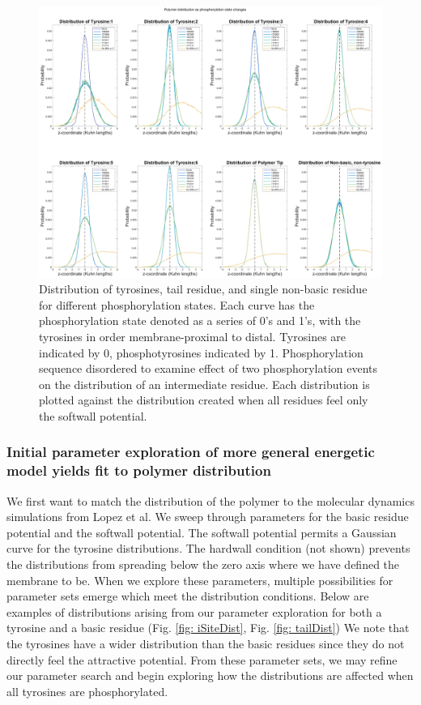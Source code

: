 \documentclass[../../AdvancementSummary.tex]{subfiles}
\begin{document}
\begin{figure}[H]
\begin{center}
\includegraphics[width=\linewidth]{ResultsFigures/CD3ZetaSoftwallPiecewiseBasicsY/Phosphorylation/iSiteDistribution135624.eps}
\end{center}
\caption{Distribution of tyrosines, tail residue, and single non-basic residue for different phosphorylation states. Each curve has the phosphorylation state denoted as a series of 0's and 1's, with the tyrosines in order membrane-proximal to distal. Tyrosines are indicated by 0, phosphotyrosines indicated by 1. Phosphorylation sequence disordered to examine effect of two phosphorylation events on the distribution of an intermediate residue. Each distribution is plotted against the distribution created when all residues feel only the softwall potential. \label{fig: Dist135624}}
\end{figure}

\subsubsection{Initial parameter exploration of more general energetic model yields fit to polymer distribution}

We first want to match the distribution of the polymer to the molecular dynamics simulations from Lopez et al. We sweep through parameters for the basic residue potential and the softwall potential. The softwall potential permits a Gaussian curve for the tyrosine distributions. The hardwall condition (not shown) prevents the distributions from spreading below the zero axis where we have defined the membrane to be. When we explore these parameters, multiple possibilities for parameter sets emerge which meet the distribution conditions. Below are examples of distributions arising from our parameter exploration for both a tyrosine and a basic residue (Fig. \ref{fig: iSiteDist}, Fig. \ref{fig: tailDist}) We note that the tyrosines have a wider distribution than the basic residues since they do not directly feel the attractive potential. From these parameter sets, we may refine our parameter search and begin exploring how the distributions are affected when all tyrosines are phosphorylated. 
\end{document}
